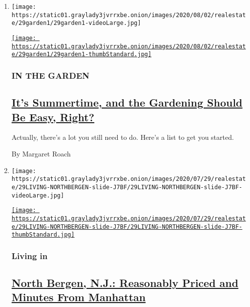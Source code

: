 \begin{enumerate}
\def\labelenumi{\arabic{enumi}.}
\item
  \texttt{[image: https://static01.graylady3jvrrxbe.onion/images/2020/08/02/realestate/29garden1/29garden1-videoLarge.jpg]}

  \href{/2020/07/29/realestate/garden-summer-august-chores.html}{\texttt{[image: https://static01.graylady3jvrrxbe.onion/images/2020/08/02/realestate/29garden1/29garden1-thumbStandard.jpg]}}

  \hypertarget{in-the-garden}{%
  \subsubsection{IN THE GARDEN}\label{in-the-garden}}

  \hypertarget{its-summertime-and-the-gardening-should-be-easy-right}{%
  \subsection{\texorpdfstring{\href{/2020/07/29/realestate/garden-summer-august-chores.html}{It's
  Summertime, and the Gardening Should Be Easy,
  Right?}}{It's Summertime, and the Gardening Should Be Easy, Right?}}\label{its-summertime-and-the-gardening-should-be-easy-right}}

  Actually, there's a lot you still need to do. Here's a list to get you
  started.

  By Margaret Roach
\item
  \texttt{[image: https://static01.graylady3jvrrxbe.onion/images/2020/07/29/realestate/29LIVING-NORTHBERGEN-slide-J7BF/29LIVING-NORTHBERGEN-slide-J7BF-videoLarge.jpg]}

  \href{/2020/07/29/realestate/north-bergen-nj-reasonably-priced-and-minutes-from-manhattan.html}{\texttt{[image: https://static01.graylady3jvrrxbe.onion/images/2020/07/29/realestate/29LIVING-NORTHBERGEN-slide-J7BF/29LIVING-NORTHBERGEN-slide-J7BF-thumbStandard.jpg]}}

  \hypertarget{living-in}{%
  \subsubsection{Living in}\label{living-in}}

  \hypertarget{north-bergen-nj-reasonably-priced-and-minutes-from-manhattan}{%
  \subsection{\texorpdfstring{\href{/2020/07/29/realestate/north-bergen-nj-reasonably-priced-and-minutes-from-manhattan.html}{North
  Bergen, N.J.: Reasonably Priced and Minutes From
  Manhattan}}{North Bergen, N.J.: Reasonably Priced and Minutes From Manhattan}}\label{north-bergen-nj-reasonably-priced-and-minutes-from-manhattan}}


\end{enumerate}

